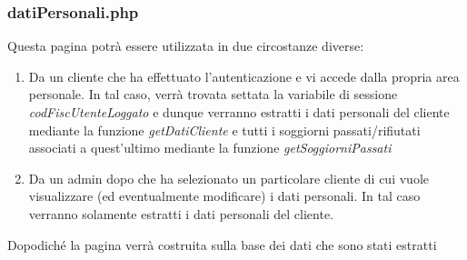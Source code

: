 \documentclass [a4paper, 12pt]{book}
\begin{document}
\subsubsection{datiPersonali.php}
Questa pagina potrà essere utilizzata in due circostanze diverse: 
\begin{enumerate}
\item Da un cliente che ha effettuato l'autenticazione e vi accede dalla propria area personale. In tal caso, verrà trovata settata la variabile di sessione \textit{codFiscUtenteLoggato} e dunque verranno estratti i dati personali del cliente mediante la funzione \textit{getDatiCliente} e tutti i soggiorni passati/rifiutati associati a quest'ultimo mediante la funzione \textit{getSoggiorniPassati}
\item Da un admin dopo che ha selezionato un particolare cliente di cui vuole visualizzare (ed eventualmente modificare) i dati personali. In tal caso verranno solamente estratti i dati personali del cliente.
\end{enumerate}
Dopodiché la pagina verrà costruita sulla base dei dati che sono stati estratti
\end{document}
